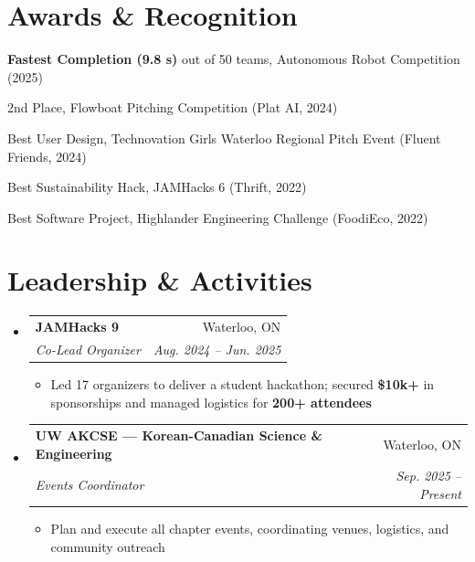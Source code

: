 \documentclass[letterpaper,11pt]{article}
\makeatletter
\newcommand{\resumeItem}[1]{\item\small{{#1 \vspace{-2pt}}}}
\newcommand{\resumeSubheading}[4]{
  \vspace{-2pt}\item
    \begin{tabular*}{0.97\textwidth}[t]{l@{\extracolsep{\fill}}r}
      \textbf{#1} & #2 \\
      \textit{\small#3} & \textit{\small #4} \\
    \end{tabular*}\vspace{-7pt}
}
\newcommand{\resumeSubHeadingListStart}{\begin{itemize}[leftmargin=0.15in, label={}]}
\newcommand{\resumeSubHeadingListEnd}{\end{itemize}}
\newcommand{\resumeItemListStart}{\begin{itemize}}
\newcommand{\resumeItemListEnd}{\end{itemize}\vspace{-5pt}}
\makeatother
\begin{document}
\section{Awards \& Recognition}
  \begin{itemize}[leftmargin=0.15in, label={--}]
    \small{
      \item \textbf{Fastest Completion (9.8 s)} out of 50 teams, Autonomous Robot Competition (2025)
      \item 2nd Place, Flowboat Pitching Competition (Plat AI, 2024)
      \item Best User Design, Technovation Girls Waterloo Regional Pitch Event (Fluent Friends, 2024)
      \item Best Sustainability Hack, JAMHacks 6 (Thrift, 2022)
      \item Best Software Project, Highlander Engineering Challenge (FoodiEco, 2022)
    }
  \end{itemize}

\section{Leadership \& Activities}
  \resumeSubHeadingListStart
    \resumeSubheading
      {JAMHacks 9}{Waterloo, ON}
      {Co-Lead Organizer}{Aug. 2024 -- Jun. 2025}
      \resumeItemListStart
        \resumeItem{Led 17 organizers to deliver a student hackathon; secured \textbf{\$10k+} in sponsorships and managed logistics for \textbf{200+ attendees}}
      \resumeItemListEnd
    \resumeSubheading
      {UW AKCSE — Korean-Canadian Science \& Engineering}{Waterloo, ON}
      {Events Coordinator}{Sep. 2025 -- Present}
      \resumeItemListStart
        \resumeItem{Plan and execute all chapter events, coordinating venues, logistics, and community outreach}
      \resumeItemListEnd
  \resumeSubHeadingListEnd
\end{document}
